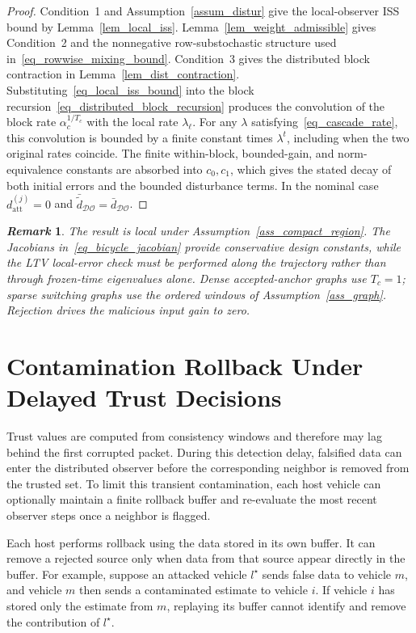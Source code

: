 \documentclass[letterpaper,journal]{IEEEtran}
\def\DO{\mathcal{DO}} %
\newtheorem{remark}{\it Remark}%
\begin{document}
\begin{proof}
Condition~1 and Assumption~\ref{assum_distur} give the local-observer ISS bound by Lemma~\ref{lem_local_iss}. Lemma~\ref{lem_weight_admissible} gives Condition~2 and the nonnegative row-substochastic structure used in~\eqref{eq_rowwise_mixing_bound}. Condition~3 gives the distributed block contraction in Lemma~\ref{lem_dist_contraction}. Substituting~\eqref{eq_local_iss_bound} into the block recursion~\eqref{eq_distributed_block_recursion} produces the convolution of the block rate $\alpha_c^{1/T_c}$ with the local rate $\lambda_{\ell}$. For any $\lambda$ satisfying~\eqref{eq_cascade_rate}, this convolution is bounded by a finite constant times $\lambda^t$, including when the two original rates coincide. The finite within-block, bounded-gain, and norm-equivalence constants are absorbed into $c_0,c_1$, which gives the stated decay of both initial errors and the bounded disturbance terms. In the nominal case $d_{\mathrm{att}}^{(j)}=0$ and $\bar{\tilde d}_{\DO}=\bar d_{\DO}$.
\end{proof}

\begin{remark}
The result is local under Assumption~\ref{ass_compact_region}. The Jacobians in~\eqref{eq_bicycle_jacobian} provide conservative design constants, while the LTV local-error check must be performed along the trajectory rather than through frozen-time eigenvalues alone. Dense accepted-anchor graphs use $T_c=1$; sparse switching graphs use the ordered windows of Assumption~\ref{ass_graph}. Rejection drives the malicious input gain to zero.
\end{remark}

\section{Contamination Rollback Under Delayed Trust Decisions}\label{sec_rollback}
Trust values are computed from consistency windows and therefore may lag behind the first corrupted packet. During this detection delay, falsified data can enter the distributed observer before the corresponding neighbor is removed from the trusted set. To limit this transient contamination, each host vehicle can optionally maintain a finite rollback buffer and re-evaluate the most recent observer steps once a neighbor is flagged.

Each host performs rollback using the data stored in its own buffer. It can remove a rejected source only when data from that source appear directly in the buffer. For example, suppose an attacked vehicle $l^{\star}$ sends false data to vehicle $m$, and vehicle $m$ then sends a contaminated estimate to vehicle $i$. If vehicle $i$ has stored only the estimate from $m$, replaying its buffer cannot identify and remove the contribution of $l^{\star}$.
\end{document}
